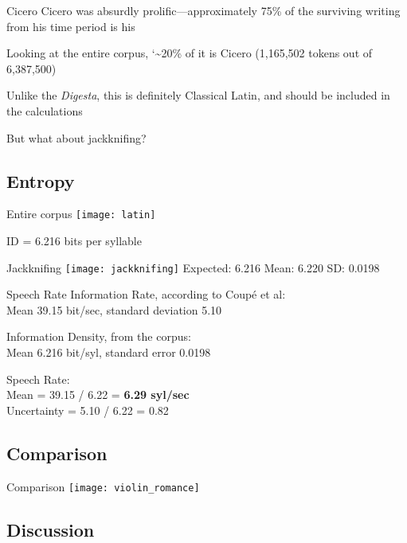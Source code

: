 \documentclass{beamer}
\newcommand{\realtilde}{\char`\~}
\begin{document}
\begin{frame}{Cicero}
Cicero was absurdly prolific---approximately 75\% of the surviving writing from his time period is his

Looking at the entire corpus, \realtilde{}20\% of it is Cicero (1,165,502 tokens out of 6,387,500)

Unlike the \emph{Digesta}, this is definitely Classical Latin, and should be included in the calculations

But what about jackknifing?
\end{frame}

\subsection{Entropy}

\begin{frame}{Entire corpus}
\texttt{[image: latin]}

ID = 6.216 bits per syllable
\end{frame}

\begin{frame}{Jackknifing}
\texttt{[image: jackknifing]}
Expected: 6.216 Mean: 6.220 SD: 0.0198
\end{frame}

\begin{frame}{Speech Rate}
Information Rate, according to Coupé et al:\\
\quad Mean 39.15 bit/sec, standard deviation 5.10

Information Density, from the corpus:\\
\quad Mean 6.216 bit/syl, standard error 0.0198

Speech Rate:\\
Mean = 39.15 / 6.22 = \textbf{6.29 syl/sec} \\
\quad Uncertainty = 5.10 / 6.22 = 0.82
\end{frame}

\subsection{Comparison}

\begin{frame}{Comparison}
\texttt{[image: violin\_romance]}
\end{frame}

\subsection{Discussion}
\end{document}
